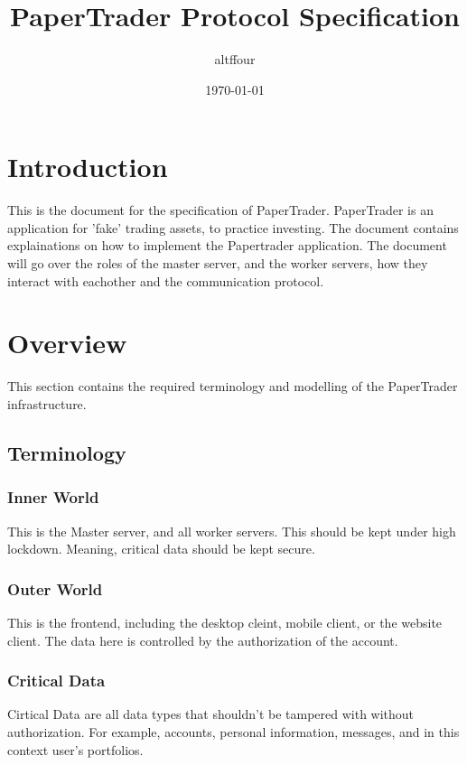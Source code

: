 \documentclass[a4paper]{article}
\title{PaperTrader Protocol Specification}
\author{altffour}
\date{\today}
\begin{document}
\maketitle
\tableofcontents
\newpage

\section{Introduction}
\label{intro}
This is the document for the specification of PaperTrader. PaperTrader is an
application for 'fake' trading assets, to practice investing. The document
contains explainations on how to implement the Papertrader application. The
document will go over the roles of the master server, and the worker servers, 
how they interact with eachother and the communication protocol.

\section{Overview}
This section contains the required terminology and modelling of the PaperTrader
infrastructure.

\subsection{Terminology}
\label{term}

\subsubsection{Inner World}
\label{term_inner}
This is the Master server, and all worker servers. This should be kept under 
high lockdown. Meaning, critical data should be kept secure.

\subsubsection{Outer World}
\label{term_outer}
This is the frontend, including the desktop cleint, mobile client, or the
website client. The data here is controlled by the authorization of the 
account.

\subsubsection{Critical Data}
\label{term_criticaldata}
Cirtical Data are all data types that shouldn't be tampered with without
authorization. For example, accounts, personal information, messages, and in
this context user's portfolios.
\end{document}
